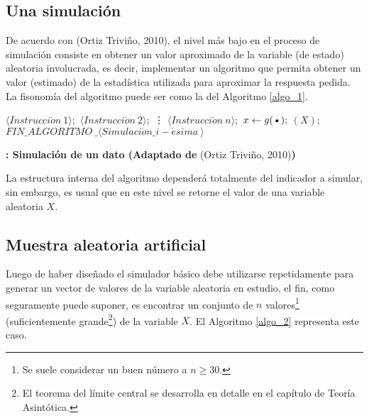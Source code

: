 \subsection{Una simulación}

De acuerdo con (Ortiz Triviño, 2010), el nivel más bajo en el proceso de simulación consiste en obtener un valor aproximado de la variable (de estado) aleatoria involucrada, es decir, implementar un algoritmo que permita obtener un valor (estimado) de la estadística utilizada para aproximar la respuesta pedida. La fisonomía del algoritmo puede ser como la del Algoritmo \ref{algo_1}.

\algrenewcommand{}

\begin{algorithm}
\begin{algorithmic}[0]
    \Loop
        \State $\langle Instrucci\acute{o}n\ 1\rangle;$
        \State $\langle Instrucci\acute{o}n\ 2\rangle;$
        \State \qquad \vdots
        \State $\langle Instrucci\acute{o}n\ n\rangle;$
        \State $x \gets g(\text{\textbullet});$
        \State \Return $(X);$
    \EndLoop \State $FIN\_ALGORITMO\ \_\langle Simulaci\acute{o}n\_i-\acute{e}sima\ \rangle$
\EndFunction
\end{algorithmic}
\caption{\!\textbf{: Simulación de un dato (Adaptado de }(Ortiz Triviño, 2010)\textbf{)}}\label{algo_1}
\end{algorithm}

La estructura interna del algoritmo dependerá totalmente del indicador a simular, sin embargo, es usual que en este nivel se retorne el valor de una variable aleatoria $X$.

\subsection{Muestra aleatoria artificial}

Luego de haber diseñado el simulador básico debe utilizarse repetidamente para generar un vector de valores de la variable aleatoria en estudio, el fin, como seguramente puede suponer, es encontrar un conjunto de $n$ valores\footnote{Se suele considerar un buen número a $n\geq30.$} (suficientemente  grande\footnote{El teorema del límite central se desarrolla en detalle en el capítulo de Teoría Asintótica.}) de la variable $X$. El Algoritmo \ref{algo_2}  representa este caso.

